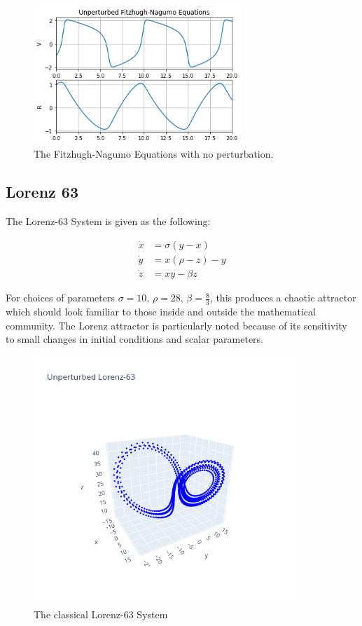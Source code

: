 \documentclass[12pt]{article}
\begin{document}
\begin{figure}[ht]
  \centering
  \includegraphics[width=0.7\textwidth]{fn-unperturbed.png}
  \caption{The Fitzhugh-Nagumo Equations with no perturbation.}
\end{figure}



\subsection{Lorenz 63}

The Lorenz-63 System is given as the following:

\begin{align*}
  \dot{x} &= \sigma (y - x)\\
  \dot{y} &= x ( \rho - z ) - y\\
  \dot{z} &= x y - \beta z
\end{align*}

For choices of parameters $\sigma=10,\, \rho=28,\, \beta=\frac{8}{3}$, this produces a chaotic attractor which should look familiar to those inside and outside the mathematical community. The Lorenz attractor is particularly noted because of its sensitivity to small changes in initial conditions and scalar parameters.

\begin{figure}[ht]
  \centering
  \includegraphics[width=0.9\textwidth]{lorenz-unperturbed.png}
  \caption{The classical Lorenz-63 System}
\end{figure}
\end{document}

